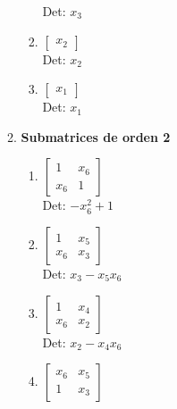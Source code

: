 \documentclass[12pt]{article}
\begin{document}
\begin{enumerate}
\begin{enumerate}
\begin{enumerate}
Det: $x_{3}$\\


\item $\displaystyle \left[\begin{matrix}x_{2}\end{matrix}\right]$\\

Det: $x_{2}$\\


\item $\displaystyle \left[\begin{matrix}x_{1}\end{matrix}\right]$\\

Det: $x_{1}$\\

\end{enumerate}

\item {\bf Submatrices de orden 2}\\

\begin{enumerate}


\item $\displaystyle \left[\begin{matrix}1 & x_{6}\\x_{6} & 1\end{matrix}\right]$\\

Det: $- x_{6}^{2} + 1$\\


\item $\displaystyle \left[\begin{matrix}1 & x_{5}\\x_{6} & x_{3}\end{matrix}\right]$\\

Det: $x_{3} - x_{5} x_{6}$\\


\item $\displaystyle \left[\begin{matrix}1 & x_{4}\\x_{6} & x_{2}\end{matrix}\right]$\\

Det: $x_{2} - x_{4} x_{6}$\\


\item $\displaystyle \left[\begin{matrix}x_{6} & x_{5}\\1 & x_{3}\end{matrix}\right]$\\


\end{enumerate}
\end{enumerate}
\end{enumerate}
\end{document}
